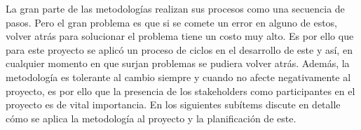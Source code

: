 La gran parte de las metodologías realizan sus procesos como una secuencia de pasos. Pero el gran problema es que si se comete un error en alguno de estos, volver atrás para solucionar el problema tiene un costo muy alto. Es por ello que para este proyecto se aplicó un proceso de ciclos en el desarrollo de este y así, en cualquier momento en que surjan problemas se pudiera volver atrás. Además, la metodología es tolerante al cambio siempre y cuando no afecte negativamente al proyecto, es por ello que la presencia de los stakeholders como participantes en el proyecto es de vital importancia. En los siguientes subítems discute en detalle cómo se aplica la metodología al proyecto y la planificación de este.